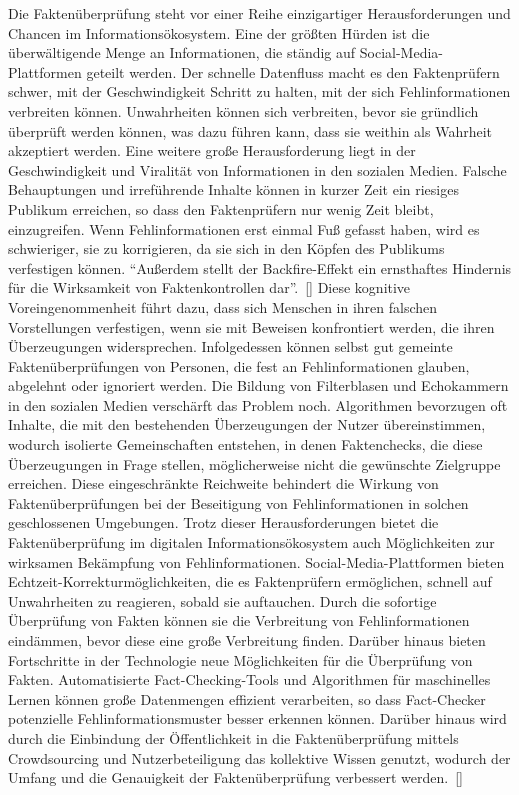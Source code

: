 \documentclass[a4paper,listof=totoc,bibliography=totoc]{scrartcl}
\begin{document}
Die Faktenüberprüfung steht vor einer Reihe einzigartiger Herausforderungen und Chancen im Informationsökosystem. Eine der größten Hürden ist die überwältigende Menge 
an Informationen, die ständig auf Social-Media-Plattformen geteilt werden. Der schnelle Datenfluss macht es den Faktenprüfern schwer, mit der Geschwindigkeit Schritt 
zu halten, mit der sich Fehlinformationen verbreiten können. Unwahrheiten können sich verbreiten, bevor sie gründlich überprüft werden können, was dazu führen kann, 
dass sie weithin als Wahrheit akzeptiert werden. Eine weitere große Herausforderung liegt in der Geschwindigkeit und Viralität von Informationen in den sozialen Medien. 
Falsche Behauptungen und irreführende Inhalte können in kurzer Zeit ein riesiges Publikum erreichen, so dass den Faktenprüfern nur wenig Zeit bleibt, einzugreifen. Wenn 
Fehlinformationen erst einmal Fuß gefasst haben, wird es schwieriger, sie zu korrigieren, da sie sich in den Köpfen des Publikums verfestigen können.
\newline
\newline
``Außerdem stellt der Backfire-Effekt ein ernsthaftes Hindernis für die Wirksamkeit von Faktenkontrollen dar''.~[\cite{nyhan2010}] Diese kognitive Voreingenommenheit führt dazu, dass sich 
Menschen in ihren falschen Vorstellungen verfestigen, wenn sie mit Beweisen konfrontiert werden, die ihren Überzeugungen widersprechen. Infolgedessen können selbst gut 
gemeinte Faktenüberprüfungen von Personen, die fest an Fehlinformationen glauben, abgelehnt oder ignoriert werden. Die Bildung von Filterblasen und Echokammern in den 
sozialen Medien verschärft das Problem noch. Algorithmen bevorzugen oft Inhalte, die mit den bestehenden Überzeugungen der Nutzer übereinstimmen, wodurch isolierte Gemeinschaften 
entstehen, in denen Faktenchecks, die diese Überzeugungen in Frage stellen, möglicherweise nicht die gewünschte Zielgruppe erreichen. Diese eingeschränkte Reichweite behindert die 
Wirkung von Faktenüberprüfungen bei der Beseitigung von Fehlinformationen in solchen geschlossenen Umgebungen.
\newline
\newline
Trotz dieser Herausforderungen bietet die Faktenüberprüfung im digitalen Informationsökosystem auch Möglichkeiten zur wirksamen Bekämpfung von Fehlinformationen. Social-Media-Plattformen 
bieten Echtzeit-Korrekturmöglichkeiten, die es Faktenprüfern ermöglichen, schnell auf Unwahrheiten zu reagieren, sobald sie auftauchen. Durch die sofortige Überprüfung von Fakten 
können sie die Verbreitung von Fehlinformationen eindämmen, bevor diese eine große Verbreitung finden. Darüber hinaus bieten Fortschritte in der Technologie neue Möglichkeiten 
für die Überprüfung von Fakten. Automatisierte Fact-Checking-Tools und Algorithmen für maschinelles Lernen können große Datenmengen effizient verarbeiten, so dass Fact-Checker 
potenzielle Fehlinformationsmuster besser erkennen können. Darüber hinaus wird durch die Einbindung der Öffentlichkeit in die Faktenüberprüfung mittels Crowdsourcing und Nutzerbeteiligung 
das kollektive Wissen genutzt, wodurch der Umfang und die Genauigkeit der Faktenüberprüfung verbessert werden.~[\cite{Hassan2015}]
\end{document}
